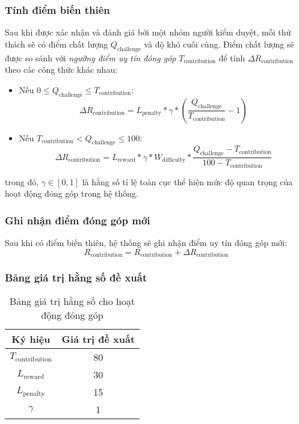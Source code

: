 \subsubsection{Tính điểm biến thiên}

Sau khi được xác nhận và đánh giá bởi một nhóm người kiểm duyệt, mỗi thử thách sẽ có điểm chất lượng $Q_{\text{challenge}}$ và độ khó cuối cùng.
Điểm chất lượng sẽ được so sánh với \textit{ngưỡng điểm uy tín đóng góp} $T_{\text{contribution}}$ để tính $\Delta R_{\text{contribution}}$ theo các công thức khác nhau:

\begin{itemize}
  \item Nếu $0 \leq Q_{\text{challenge}} \leq  T_{\text{contribution}}$:
        \[\Delta R_{\text{contribution}} = L_{\text{penalty}} * \gamma * \left( \frac{Q_{\text{challenge}}}{T_{\text{contribution}}} - 1 \right)    \]
  \item Nếu $T_{\text{contribution}} < Q_{\text{challenge}} \leq 100$:
        \[\Delta R_{\text{contribution}} = L_{\text{reward}} * \gamma * W_{\text{difficulty}} * \frac{Q_{\text{challenge}} - T_{\text{contribution}}}{100-T_{\text{contribution}}}    \]
\end{itemize}
trong đó, $\gamma \in [0, 1]$ là hằng số tỉ lệ toàn cục thể hiện mức độ quan trọng của hoạt động đóng góp trong hệ thống.

\subsubsection{Ghi nhận điểm đóng góp mới}

Sau khi có điểm biến thiên, hệ thống sẽ ghi nhận điểm uy tín đóng góp mới:
\[R_{\text{contribution}} = R_{\text{contribution}} + \Delta R_{\text{contribution}}\]

\subsubsection{Bảng giá trị hằng số đề xuất}

\begin{table}[H]
  \centering
  \begin{tabular}{|c|c|}
    \hline
    \textbf{Ký hiệu}          & \textbf{Giá trị đề xuất} \\ \hline
    $T_{\text{contribution}}$ & 80                       \\ \hline
    $L_{\text{reward}}$       & 30                       \\ \hline
    $L_{\text{penalty}}$      & 15                       \\ \hline
    $\gamma$                  & 1                        \\ \hline
  \end{tabular}
  \caption{Bảng giá trị hằng số cho hoạt động đóng góp}
  \label{tab:suggested-constant-values-for-contribution}
\end{table}

